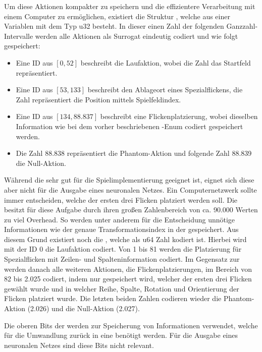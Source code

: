 

Um diese Aktionen kompakter zu speichern und die effizientere Verarbeitung mit einem Computer zu ermöglichen, existiert die Struktur , welche aus einer Variablen mit dem Typ \ac{u32} besteht. In dieser einen Zahl der folgenden Ganzzahl-Intervalle werden alle Aktionen als Surrogat eindeutig codiert und wie folgt gespeichert:
\begin{itemize}
    \item Eine \ac{ID} aus $[0, 52]$ beschreibt die Laufaktion, wobei die Zahl das Startfeld repräsentiert.
    \item Eine \ac{ID} aus $[53, 133]$ beschreibt den Ablageort eines Spezialflickens, die Zahl repräsentiert die Position mittels Spielfeldindex.
    \item Eine \ac{ID} aus $[134, 88.837]$ beschreibt eine Flickenplatzierung, wobei dieselben Information wie bei dem vorher beschriebenen -Enum codiert gespeichert werden.
    \item Die Zahl 88.838 repräsentiert die Phantom-Aktion und folgende Zahl 88.839 die Null-Aktion.
\end{itemize}
Während die  sehr gut für die Spielimplementierung geeignet ist, eignet sich diese aber nicht für die Ausgabe eines neuronalen Netzes. Ein Computernetzwerk sollte immer entscheiden, welche der ersten drei Flicken platziert werden soll. Die  besitzt für diese Aufgabe durch ihren großen Zahlenbereich von ca. 90.000 Werten zu viel Overhead. So werden unter anderem für die Entscheidung unnötige Informationen wie der genaue Transformationsindex in der  gespeichert. Aus diesem Grund existiert noch die , welche als \ac{u64} Zahl kodiert ist. Hierbei wird mit der \ac{ID} 0 die Laufaktion codiert. Von 1 bis 81 werden die Platzierung für Spezialflicken mit Zeilen- und Spalteninformation codiert. Im Gegensatz zur  werden danach alle weiteren Aktionen, die Flickenplatzierungen, im Bereich von 82 bis 2.025 codiert, indem nur gespeichert wird, welcher der ersten drei Flicken gewählt wurde und in welcher Reihe, Spalte, Rotation und Orientierung der Flicken platziert wurde. Die letzten beiden Zahlen codieren wieder die Phantom-Aktion (2.026) und die Null-Aktion (2.027).

Die oberen Bits der  werden zur Speicherung von Informationen verwendet, welche für die Umwandlung zurück in eine  benötigt werden. Für die Ausgabe eines neuronalen Netzes sind diese Bits nicht relevant.

